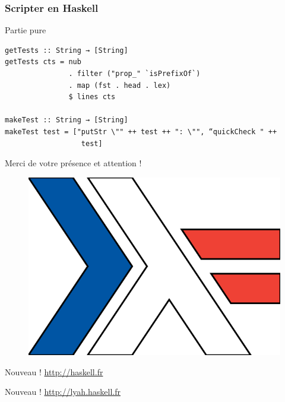 \documentclass[10pt]{beamer}
\begin{document}
\begin{frame}[fragile]
\frametitle{Scripter en Haskell}
\begin{block}{Partie pure}
\begin{verbatim}
getTests :: String → [String]
getTests cts = nub
               . filter ("prop_" `isPrefixOf`)
               . map (fst . head . lex)
               $ lines cts

makeTest :: String → [String]
makeTest test = ["putStr \"" ++ test ++ ": \"", “quickCheck " ++
                  test]
\end{verbatim}
\end{block}
\end{frame}



\begin{frame}
\centerline{Merci de votre présence et attention !}

\begin{figure}
\includegraphics[scale=0.4]{haskell_fr_logo.png}
\end{figure}

\centerline{Nouveau ! \url{http://haskell.fr}}

\centerline{Nouveau ! \url{http://lyah.haskell.fr}}
\end{frame}
\end{document}
